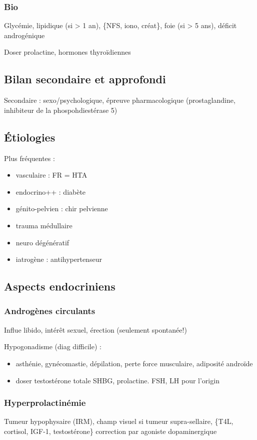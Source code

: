 \documentclass[11pt]{article}
\begin{document}
\subsubsection{Bio}
\label{sec:orgbc35219}
Glycémie, lipidique (si > 1 an), \{NFS, iono, créat\}, foie (si > 5 ans), déficit
androgénique

Doser prolactine, hormones thyroïdiennes

\subsection{Bilan secondaire et approfondi}
\label{sec:org42ab406}
Secondaire : sexo/psychologique, épreuve pharmacologique (prostaglandine,
inhibiteur de la phospohdiestérase 5)

\subsection{Étiologies}
\label{sec:orgc9c4afd}
Plus fréquentes :
\begin{itemize}
\item vasculaire : FR = HTA
\item endocrino++ : diabète
\item génito-pelvien : chir pelvienne
\item trauma médullaire
\item neuro dégénératif
\item iatrogène : antihypertenseur
\end{itemize}

\subsection{Aspects endocriniens}
\label{sec:org5fb15ea}
\subsubsection{Androgènes circulants}
\label{sec:org2e7aee1}
Influe libido, intérêt sexuel, érection (seulement spontanée!)

Hypogonadisme (diag difficile) : 
\begin{itemize}
\item asthénie, gynécomastie, dépilation, perte force musculaire, adiposité androïde
\item doser testostérone totale \textpm{} SHBG, prolactine. FSH, LH pour l'origin
\end{itemize}

\subsubsection{Hyperprolactinémie}
\label{sec:org79fc6a8}
Tumeur hypophysaire (IRM), champ visuel si tumeur
supra-sellaire, \{T4L, cortisol, IGF-1, testostérone\}
\thus correction par agoniste dopaminergique
\end{document}
